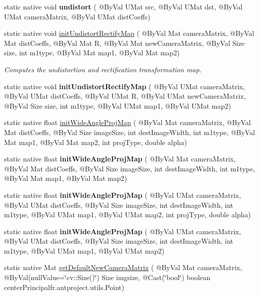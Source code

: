 \begin{DoxyCompactItemize}
\item 
static native void {\bfseries undistort} ( @By\+Val U\+Mat src, @By\+Val U\+Mat dst, @By\+Val U\+Mat camera\+Matrix, @By\+Val U\+Mat dist\+Coeffs)
\item 
static native void \hyperlink{group__imgproc__transform_gaf3c4192c811a2204d996dacf82f23564}{init\+Undistort\+Rectify\+Map} ( @By\+Val Mat camera\+Matrix, @By\+Val Mat dist\+Coeffs, @By\+Val Mat R, @By\+Val Mat new\+Camera\+Matrix, @By\+Val Size size, int m1type, @By\+Val Mat map1, @By\+Val Mat map2)
\begin{DoxyCompactList}\small\item\em Computes the undistortion and rectification transformation map. \end{DoxyCompactList}\item 
static native void {\bfseries init\+Undistort\+Rectify\+Map} ( @By\+Val U\+Mat camera\+Matrix, @By\+Val U\+Mat dist\+Coeffs, @By\+Val U\+Mat R, @By\+Val U\+Mat new\+Camera\+Matrix, @By\+Val Size size, int m1type, @By\+Val U\+Mat map1, @By\+Val U\+Mat map2)
\item 
static native float \hyperlink{group__imgproc__transform_ga797a671a89ffc5375a87366fbbb86c13}{init\+Wide\+Angle\+Proj\+Map} ( @By\+Val Mat camera\+Matrix, @By\+Val Mat dist\+Coeffs, @By\+Val Size image\+Size, int dest\+Image\+Width, int m1type, @By\+Val Mat map1, @By\+Val Mat map2, int proj\+Type, double alpha)
\item 
static native float {\bfseries init\+Wide\+Angle\+Proj\+Map} ( @By\+Val Mat camera\+Matrix, @By\+Val Mat dist\+Coeffs, @By\+Val Size image\+Size, int dest\+Image\+Width, int m1type, @By\+Val Mat map1, @By\+Val Mat map2)
\item 
static native float {\bfseries init\+Wide\+Angle\+Proj\+Map} ( @By\+Val U\+Mat camera\+Matrix, @By\+Val U\+Mat dist\+Coeffs, @By\+Val Size image\+Size, int dest\+Image\+Width, int m1type, @By\+Val U\+Mat map1, @By\+Val U\+Mat map2, int proj\+Type, double alpha)
\item 
static native float {\bfseries init\+Wide\+Angle\+Proj\+Map} ( @By\+Val U\+Mat camera\+Matrix, @By\+Val U\+Mat dist\+Coeffs, @By\+Val Size image\+Size, int dest\+Image\+Width, int m1type, @By\+Val U\+Mat map1, @By\+Val U\+Mat map2)
\item 
static native Mat \hyperlink{group__imgproc__transform_gadf9fb3deefd512a073b449832fe60679}{get\+Default\+New\+Camera\+Matrix} ( @By\+Val Mat camera\+Matrix, @By\+Val(null\+Value=\char`\"{}cv\+::\+Size()\char`\"{}) Size imgsize, @Cast(\char`\"{}bool\char`\"{}) boolean center\+Principal\+fr.antproject.utils.Point)

\end{DoxyCompactItemize}
